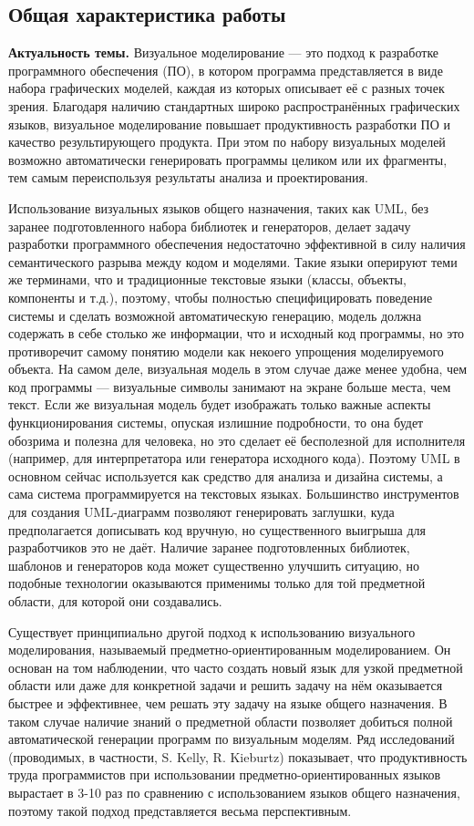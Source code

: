 \subsection*{\Large Общая характеристика работы}
\fontsize{14pt}{15pt}\selectfont
\textbf{Актуальность темы.}
Визуальное моделирование --- это подход к разработке программного обеспечения (ПО), в котором программа представляется 
в виде набора графических моделей, каждая из которых описывает её с разных точек 
зрения. Благодаря наличию стандартных широко распространённых графических языков, 
визуальное моделирование повышает продуктивность разработки ПО и качество результирующего 
продукта. При этом по набору визуальных моделей возможно автоматически генерировать программы 
целиком или их фрагменты, тем самым переиспользуя результаты анализа и проектирования.

Использование визуальных языков общего назначения, таких как UML, без заранее 
подготовленного набора библиотек и генераторов, делает задачу разработки 
программного обеспечения недостаточно эффективной в силу наличия семантического разрыва между 
кодом и моделями. Такие языки оперируют теми же терминами, что и традиционные текстовые языки 
(классы, объекты, компоненты и т.д.), поэтому, чтобы полностью специфицировать 
поведение системы и сделать возможной автоматическую генерацию, модель должна 
содержать в себе столько же информации, что и исходный код программы, но это 
противоречит самому понятию модели как некоего упрощения моделируемого объекта. 
На самом деле, визуальная модель в этом случае даже менее удобна, чем код 
программы --- визуальные символы занимают на экране больше места, чем текст. 
Если же визуальная модель будет изображать только важные аспекты 
функционирования системы, опуская излишние подробности, то она будет обозрима и полезна 
для человека, но это сделает её бесполезной для исполнителя (например, для интерпретатора или генератора исходного кода). 
Поэтому UML в основном сейчас используется как средство для анализа и 
дизайна системы, а сама система программируется на текстовых языках. Большинство инструментов 
для создания UML-диаграмм позволяют генерировать заглушки, куда предполагается дописывать код вручную, но 
существенного выигрыша для разработчиков это не даёт. Наличие заранее подготовленных 
библиотек, шаблонов и генераторов кода может существенно улучшить ситуацию, но подобные 
технологии оказываются применимы только для той предметной области, для которой они создавались.

Существует принципиально другой подход к использованию визуального 
моделирования, называемый предметно-ориентированным моделированием. Он основан на том наблюдении, что часто создать новый 
язык для узкой предметной области или даже для конкретной задачи и решить задачу 
на нём оказывается быстрее и эффективнее, чем решать эту задачу на языке общего назначения. 
В таком случае наличие знаний о предметной области позволяет добиться полной автоматической генерации программ по визуальным моделям.
Ряд исследований (проводимых, в частности, S. Kelly, R. Kieburtz) показывает, что продуктивность 
труда программистов при использовании предметно-ориентированных языков вырастает в 3-10 раз по сравнению с 
использованием языков общего назначения, поэтому такой подход представляется 
весьма перспективным.

